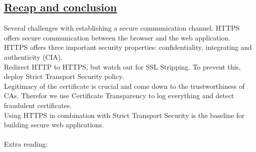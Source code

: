 \documentclass[titlepage]{article}
\begin{document}
    \subsection{\href{https://youtu.be/VBtIEQxKikY}{Recap and conclusion}}
    Several challenges with establishing a secure communication channel. HTTPS offers secure communication between the browser and the web application. HTTPS offers three important security properties: confidentiality, integrating and authenticity (CIA).\\
    Redirect HTTP to HTTPS, but watch out for SSL Stripping. To prevent this, deploy Strict Transport Security policy.\\
    Legitimacy of the certificate is crucial and come down to the trustworthiness of CAs. Therefor we use Certificate Transparency to log everything and detect fraudulent certificates.\\
    Using HTTPS in combination with Strict Transport Security is the baseline for building secure web applications.\\\\
    Extra reading:
\end{document}
